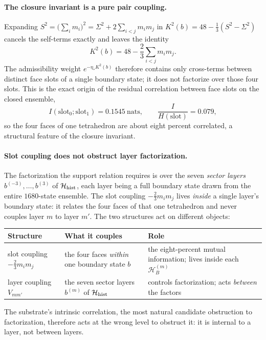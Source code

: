 \documentclass[11pt]{article}
\begin{document}
\paragraph{The closure invariant is a pure pair coupling.}
Expanding $S^2=\bigl(\sum_i m_i\bigr)^2=\Sigma^2+2\sum_{i<j}m_im_j$ in $K^2(b)=48-\tfrac13(S^2-\Sigma^2)$ cancels the self-terms exactly and leaves the identity
\[
K^2(b)=48-\frac23\sum_{i<j}m_im_j.
\]
The admissibility weight $e^{-\eta_*K^2(b)}$ therefore contains only cross-terms between distinct face slots of a single boundary state; it does not factorize over those four slots. This is the exact origin of the residual correlation between face slots on the closed ensemble,
\[
I(\text{slot}_0;\text{slot}_1)=0.1545~\text{nats},
\qquad
\frac{I}{H(\text{slot})}=0.079,
\]
so the four faces of one tetrahedron are about eight percent correlated, a structural feature of the closure invariant.

\paragraph{Slot coupling does not obstruct layer factorization.}
The factorization the support relation requires is over the seven \emph{sector layers} $b^{(-3)},\ldots,b^{(3)}$ of $\mathcal H_{\rm hist}$, each layer being a full boundary state drawn from the entire $1680$-state ensemble. The slot coupling $-\tfrac23 m_im_j$ lives \emph{inside} a single layer's boundary state: it relates the four faces of that one tetrahedron and never couples layer $m$ to layer $m'$. The two structures act on different objects:
\begin{center}
\small
\begin{tabular}{p{}p{}p{}}
\hline
Structure & What it couples & Role \\
\hline
slot coupling $-\tfrac23 m_im_j$ & the four faces \emph{within} one boundary state $b$ & the eight-percent mutual information; lives inside each $\mathcal H_B^{(m)}$ \\
layer coupling $V_{mm'}$ & the seven sector layers $b^{(m)}$ of $\mathcal H_{\rm hist}$ & controls factorization; acts \emph{between} the factors \\
\hline
\end{tabular}
\normalsize
\end{center}
The substrate's intrinsic correlation, the most natural candidate obstruction to factorization, therefore acts at the wrong level to obstruct it: it is internal to a layer, not between layers.
\end{document}
